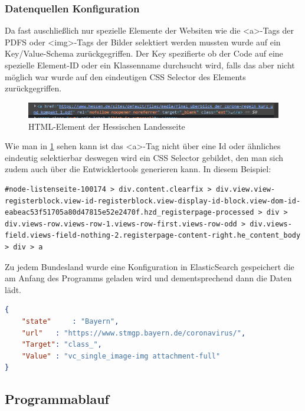 \documentclass[12pt,oneside,a4paper,parskip]{scrbook}
\begin{document}
\subsubsection{Datenquellen Konfiguration}
Da fast auschließlich nur spezielle Elemente der Websiten wie die \textless a\textgreater -Tags der PDFS oder  \textless img\textgreater -Tags der Bilder selektiert werden mussten wurde auf ein Key/Value-Schema zurückgegriffen. Der Key spezifierte ob der Code auf eine spezielle Element-ID oder ein Klassenname durchsucht wird, falls das aber nicht möglich war wurde auf den eindeutigen CSS Selector des Elements zurückgegriffen. 

\begin{figure}[H]
\caption{HTML-Element der Hessischen Landesseite}
\label{htmlHessen}
\centering
\includegraphics[scale=1.0]{pictures/hessenHTMLexample.png}
\end{figure} 

Wie man in \cref{htmlHessen} sehen kann ist das \textless a\textgreater -Tag nicht über eine Id oder ähnliches eindeutig selektierbar deswegen wird ein CSS Selector gebildet, den man sich zudem auch über die Entwicklertools generieren kann. In diesem Beispiel:
\begin{lstlisting}[caption=CSS Selector]
#node-listenseite-100174 > div.content.clearfix > div.view.view-registerblock.view-id-registerblock.view-display-id-block.view-dom-id-eabeac53f51705a80d47815e52e2470f.hzd_registerpage-processed > div > div.views-row.views-row-1.views-row-first.views-row-odd > div.views-field.views-field-nothing-2.registerpage-content-right.he_content_body > div > a
\end{lstlisting}

Zu jedem Bundesland wurde eine Konfiguration in ElasticSearch gespeichert die am Anfang des Programms geladen wird und dementsprechend dann die Daten lädt. 

\begin{lstlisting}[caption=Config von Bayern, language=json]
{
	"state" 	: "Bayern",
	"url"	: "https://www.stmgp.bayern.de/coronavirus/",
	"Target": "class_",
	"Value"	: "vc_single_image-img attachment-full"
}
\end{lstlisting}

\subsection{Programmablauf}
\end{document}

